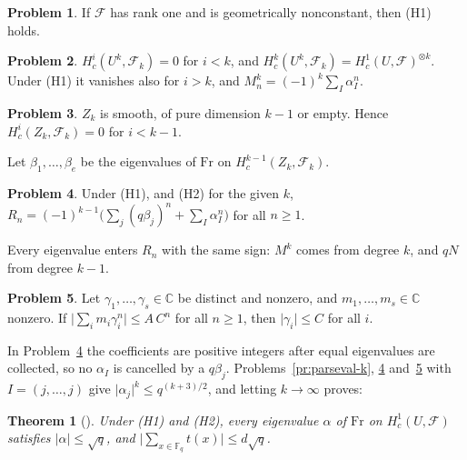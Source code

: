 \documentclass[reqno]{amsart}
\theoremstyle{definition}
\newtheorem{problem}{Problem}[section]
\theoremstyle{plain}
\newtheorem{theorem}{Theorem}[section]
\newcommand{\C}{\mathbb{C}}
\newcommand{\F}{\mathbb{F}}
\newcommand{\cF}{\mathcal{F}}
\newcommand{\Fr}{\mathrm{Fr}}
\begin{document}
\begin{problem}\label{pr:H1}
If \(\cF\) has rank one and is geometrically nonconstant, then (H1) holds.
\end{problem}

\begin{problem}\label{pr:kunneth}
\(H^i_c(U^k, \cF_k) = 0\) for \(i < k\), and \(H^k_c(U^k, \cF_k) = H^1_c(U, \cF)^{\otimes k}\).  Under (H1) it vanishes also for \(i > k\), and \(M_n^k = (-1)^k \sum_I \alpha_I^n\).
\end{problem}

\begin{problem}\label{pr:lower-half}
\(Z_k\) is smooth, of pure dimension \(k-1\) or empty.  Hence \(H^i_c(Z_k, \cF_k) = 0\) for \(i < k - 1\).
\end{problem}

Let \(\beta_1, \dots, \beta_e\) be the eigenvalues of \(\Fr\) on \(H^{k-1}_c(Z_k, \cF_k)\).

\begin{problem}\label{pr:sign}
Under (H1), and (H2) for the given \(k\),
\(R_n = (-1)^{k-1}\bigl(\sum_j (q\beta_j)^n + \sum_I \alpha_I^n\bigr)\) for all \(n \ge 1\).
\end{problem}

Every eigenvalue enters \(R_n\) with the same sign: \(M^k\) comes from degree \(k\), and \(qN\) from degree \(k - 1\).

\begin{problem}\label{pr:power}
Let \(\gamma_1, \dots, \gamma_s \in \C\) be distinct and nonzero, and \(m_1, \dots, m_s \in \C\) nonzero.  If \(\lvert \sum_i m_i \gamma_i^n \rvert \le A\, C^n\) for all \(n \ge 1\), then \(\lvert \gamma_i \rvert \le C\) for all \(i\).
\end{problem}

In Problem~\ref{pr:sign} the coefficients are positive integers after equal eigenvalues are collected, so no \(\alpha_I\) is cancelled by a \(q\beta_j\).  Problems~\ref{pr:parseval-k}, \ref{pr:sign} and~\ref{pr:power} with \(I = (j, \dots, j)\) give \(\lvert \alpha_j \rvert^k \le q^{(k+3)/2}\), and letting \(k \to \infty\) proves:

\begin{theorem}[{\cite[Theorem~2.10.2]{Dup}}]\label{th:conditional}
Under (H1) and (H2), every eigenvalue \(\alpha\) of \(\Fr\) on \(H^1_c(U, \cF)\) satisfies \(\lvert \alpha \rvert \le \sqrt q\), and \(\lvert \sum_{x \in \F_q} t(x) \rvert \le d \sqrt q\).
\end{theorem}
\end{document}
